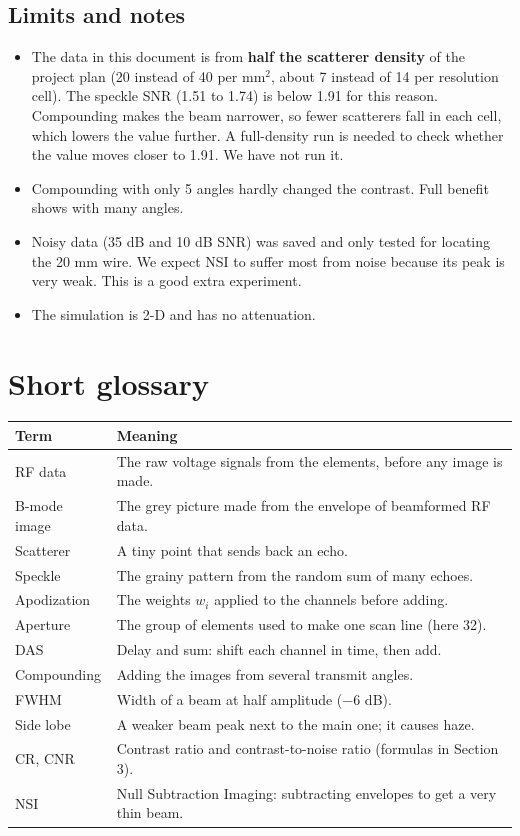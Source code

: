 \documentclass[11pt,a4paper]{article}
\begin{document}
\subsection{Limits and notes}
\begin{itemize}
\item The data in this document is from \textbf{half the scatterer density} of the project plan (20 instead of 40 per mm$^2$, about 7 instead of 14 per resolution cell). The speckle SNR (1.51 to 1.74) is below 1.91 for this reason. Compounding makes the beam narrower, so fewer scatterers fall in each cell, which lowers the value further. A full-density run is needed to check whether the value moves closer to 1.91. We have not run it.
\item Compounding with only 5 angles hardly changed the contrast. Full benefit shows with many angles.
\item Noisy data (35 dB and 10 dB SNR) was saved and only tested for locating the 20 mm wire. We expect NSI to suffer most from noise because its peak is very weak. This is a good extra experiment.
\item The simulation is 2-D and has no attenuation.
\end{itemize}

\section{Short glossary}
\begin{center}
\small
\begin{tabular}{@{}p{3.3cm}p{11.2cm}@{}}
\toprule
\textbf{Term} & \textbf{Meaning}\\
\midrule
RF data & The raw voltage signals from the elements, before any image is made.\\
B-mode image & The grey picture made from the envelope of beamformed RF data.\\
Scatterer & A tiny point that sends back an echo.\\
Speckle & The grainy pattern from the random sum of many echoes.\\
Apodization & The weights $w_i$ applied to the channels before adding.\\
Aperture & The group of elements used to make one scan line (here 32).\\
DAS & Delay and sum: shift each channel in time, then add.\\
Compounding & Adding the images from several transmit angles.\\
FWHM & Width of a beam at half amplitude ($-6$ dB).\\
Side lobe & A weaker beam peak next to the main one; it causes haze.\\
CR, CNR & Contrast ratio and contrast-to-noise ratio (formulas in Section 3).\\
NSI & Null Subtraction Imaging: subtracting envelopes to get a very thin beam.\\
\bottomrule
\end{tabular}
\end{center}
\end{document}
